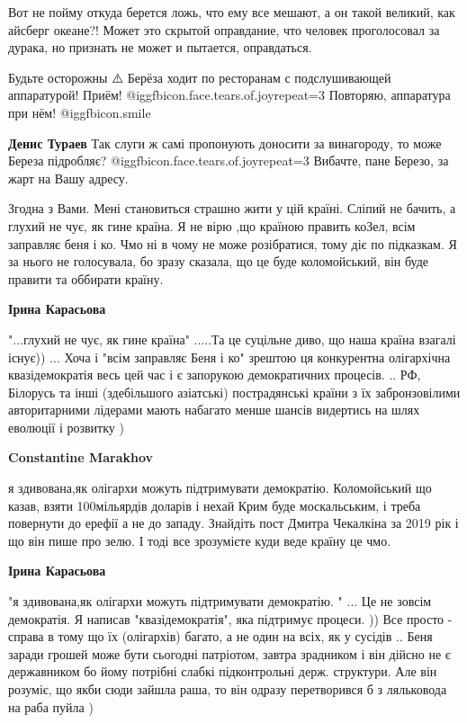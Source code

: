 \begin{itemize}

Вот не пойму откуда берется ложь, что ему все мешают, а он такой великий, как
айсберг океане?! Может это скрытой оправдание, что человек проголосовал за
дурака, но признать не может и пытается, оправдаться.



Будьте осторожны ⚠️ Берёза ходит по ресторанам с подслушивающей аппаратурой!
Приём!  @igg{fbicon.face.tears.of.joy}{repeat=3}  Повторяю, аппаратура при нём!  @igg{fbicon.smile} 

\begin{itemize} %
\textbf{Денис Тураев} Так слуги ж самі пропонують доносити за винагороду, то може Береза підробляє? @igg{fbicon.face.tears.of.joy}{repeat=3}  Вибачте, пане Березо, за жарт на Вашу адресу.
\end{itemize} %


Згодна з Вами. Мені становиться страшно жити у цій країні. Сліпий не бачить, а
глухий не чує, як гине країна. Я не вірю ,що країною править коЗел, всім
заправляє беня і ко. Чмо ні в чому не може розібратися, тому діє по підказкам.
Я за нього не голосувала, бо зразу сказала, що це буде коломойський, він буде
правити та оббирати країну.

\begin{itemize} %
\textbf{Ірина Карасьова} 

"...глухий не чує, як гине країна" .....Та це суцільне диво, що наша країна
взагалі існує)) ... Хоча і "всім заправляє Беня і ко" зрештою ця конкурентна
олігархічна квазідемократія весь цей час і є запорукою демократичних процесів.
.. РФ, Білорусь та інші (здебільшого азіатські) пострадянські країни з їх
забронзовілими авторитарними лідерами мають набагато менше шансів видертись на
шлях еволюції і розвитку )


\textbf{Constantine Marakhov} 

я здивована,як олігархи можуть підтримувати демократію. Коломойський що казав,
взяти 100мільярдів доларів і нехай Крим буде москальським, і треба повернути до
ерефії а не до западу. Знайдіть пост Дмитра Чекалкіна за 2019 рік і що він пише
про зелю. І тоді все зрозумієте куди веде країну це чмо.


\textbf{Ірина Карасьова} 

"я здивована,як олігархи можуть підтримувати демократію. " ... Це не зовсім
демократія. Я написав "квазідемократія", яка підтримує процеси. )) Все просто -
справа в тому що їх (олігархів) багато, а не один на всіх, як у сусідів .. Беня
заради грошей може бути сьогодні патріотом, завтра зрадником і він дійсно не є
державником бо йому потрібні слабкі підконтрольні держ. структури. Але він
розуміє, що якби сюди зайшла раша, то він одразу перетворився б з ляльковода на
раба пуйла )


\end{itemize}
\end{itemize}
